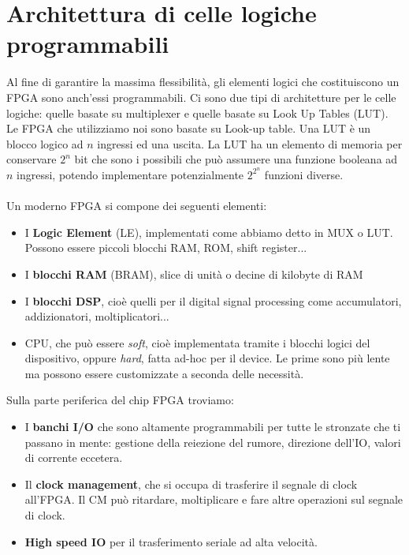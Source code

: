 \documentclass{book}
\begin{document}
\section{Architettura di celle logiche programmabili}
    Al fine di garantire la massima flessibilità, gli elementi logici che costituiscono un FPGA sono anch'essi programmabili. Ci sono due tipi di architetture per le celle logiche: quelle basate su multiplexer e quelle basate su Look Up Tables (LUT). \\
    Le FPGA che utilizziamo noi sono basate su Look-up table. Una LUT è un blocco logico ad $n$ ingressi ed una uscita. La LUT ha un elemento di memoria per conservare $2^{n}$ bit che sono i possibili che può assumere una funzione booleana ad $n$ ingressi, potendo implementare potenzialmente $2^{2^{n}}$ funzioni diverse.
    \\ \\
    Un moderno FPGA si compone dei seguenti elementi:
    \begin{itemize}
        \item I \textbf{Logic Element} (LE), implementati come abbiamo detto in MUX o LUT. Possono essere piccoli blocchi RAM, ROM, shift register...
        \item I \textbf{blocchi RAM} (BRAM), slice di unità o decine di kilobyte di RAM
        \item I \textbf{blocchi DSP}, cioè quelli per il digital signal processing come accumulatori, addizionatori, moltiplicatori...
        \item CPU, che può essere \textit{soft}, cioè implementata tramite i blocchi logici del dispositivo, oppure \textit{hard}, fatta ad-hoc per il device. Le prime sono più lente ma possono essere customizzate a seconda delle necessità.
    \end{itemize}
    Sulla parte periferica del chip FPGA troviamo:
    \begin{itemize}
        \item I \textbf{banchi I/O} che sono altamente programmabili per tutte le stronzate che ti passano in mente: gestione della reiezione del rumore, direzione dell'IO, valori di corrente eccetera.
        \item Il \textbf{clock management}, che si occupa di trasferire il segnale di clock all'FPGA. Il CM può ritardare, moltiplicare e fare altre operazioni sul segnale di clock.
        \item \textbf{High speed IO} per il trasferimento seriale ad alta velocità.
    \end{itemize}
\end{document}
